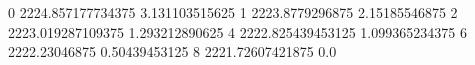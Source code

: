 0 2224.857177734375 3.131103515625
1 2223.8779296875 2.15185546875
2 2223.019287109375 1.293212890625
4 2222.825439453125 1.099365234375
6 2222.23046875 0.50439453125
8 2221.72607421875 0.0
